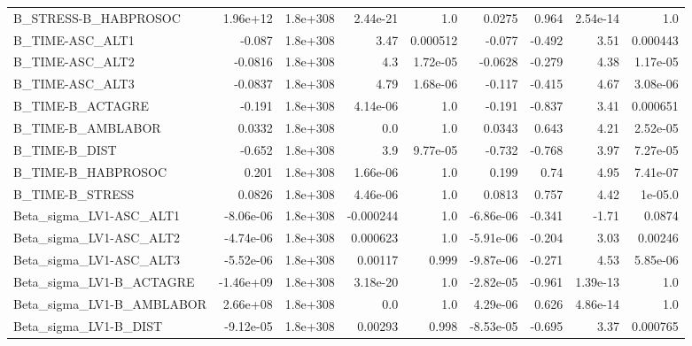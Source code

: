 \begin{tabular}{lrrrrrrrr}
B\_STRESS-B\_HABPROSOC          &    1.96e+12 &     1.8e+308 &  2.44e-21 &      1.0 &     0.0275 &       0.964 &     2.54e-14 &           1.0 \\
B\_TIME-ASC\_ALT1               &      -0.087 &     1.8e+308 &      3.47 & 0.000512 &     -0.077 &      -0.492 &         3.51 &      0.000443 \\
B\_TIME-ASC\_ALT2               &     -0.0816 &     1.8e+308 &       4.3 & 1.72e-05 &    -0.0628 &      -0.279 &         4.38 &      1.17e-05 \\
B\_TIME-ASC\_ALT3               &     -0.0837 &     1.8e+308 &      4.79 & 1.68e-06 &     -0.117 &      -0.415 &         4.67 &      3.08e-06 \\
B\_TIME-B\_ACTAGRE              &      -0.191 &     1.8e+308 &  4.14e-06 &      1.0 &     -0.191 &      -0.837 &         3.41 &      0.000651 \\
B\_TIME-B\_AMBLABOR             &      0.0332 &     1.8e+308 &       0.0 &      1.0 &     0.0343 &       0.643 &         4.21 &      2.52e-05 \\
B\_TIME-B\_DIST                 &      -0.652 &     1.8e+308 &       3.9 & 9.77e-05 &     -0.732 &      -0.768 &         3.97 &      7.27e-05 \\
B\_TIME-B\_HABPROSOC            &       0.201 &     1.8e+308 &  1.66e-06 &      1.0 &      0.199 &        0.74 &         4.95 &      7.41e-07 \\
B\_TIME-B\_STRESS               &      0.0826 &     1.8e+308 &  4.46e-06 &      1.0 &     0.0813 &       0.757 &         4.42 &       1e-05.0 \\
Beta\_sigma\_LV1-ASC\_ALT1       &   -8.06e-06 &     1.8e+308 & -0.000244 &      1.0 &  -6.86e-06 &      -0.341 &        -1.71 &        0.0874 \\
Beta\_sigma\_LV1-ASC\_ALT2       &   -4.74e-06 &     1.8e+308 &  0.000623 &      1.0 &  -5.91e-06 &      -0.204 &         3.03 &       0.00246 \\
Beta\_sigma\_LV1-ASC\_ALT3       &   -5.52e-06 &     1.8e+308 &   0.00117 &    0.999 &  -9.87e-06 &      -0.271 &         4.53 &      5.85e-06 \\
Beta\_sigma\_LV1-B\_ACTAGRE      &   -1.46e+09 &     1.8e+308 &  3.18e-20 &      1.0 &  -2.82e-05 &      -0.961 &     1.39e-13 &           1.0 \\
Beta\_sigma\_LV1-B\_AMBLABOR     &    2.66e+08 &     1.8e+308 &       0.0 &      1.0 &   4.29e-06 &       0.626 &     4.86e-14 &           1.0 \\
Beta\_sigma\_LV1-B\_DIST         &   -9.12e-05 &     1.8e+308 &   0.00293 &    0.998 &  -8.53e-05 &      -0.695 &         3.37 &      0.000765 \\

\end{tabular}

